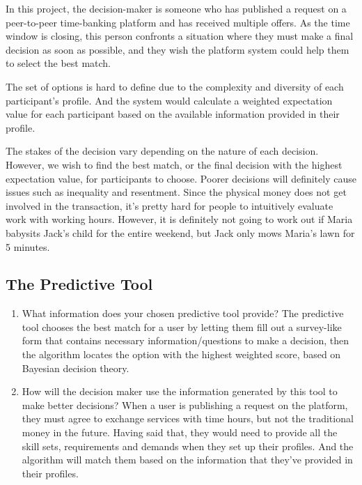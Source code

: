 \documentclass[
]{article}
\begin{document}
In this project, the decision-maker is someone who has published a
request on a peer-to-peer time-banking platform and has received
multiple offers. As the time window is closing, this person confronts a
situation where they must make a final decision as soon as possible, and
they wish the platform system could help them to select the best match.

The set of options is hard to define due to the complexity and diversity
of each participant's profile. And the system would calculate a weighted
expectation value for each participant based on the available
information provided in their profile.

The stakes of the decision vary depending on the nature of each
decision. However, we wish to find the best match, or the final decision
with the highest expectation value, for participants to choose. Poorer
decisions will definitely cause issues such as inequality and
resentment. Since the physical money does not get involved in the
transaction, it's pretty hard for people to intuitively evaluate work
with working hours. However, it is definitely not going to work out if
Maria babysits Jack's child for the entire weekend, but Jack only mows
Maria's lawn for 5 minutes.

\hypertarget{the-predictive-tool}{%
\subsection{The Predictive Tool}\label{the-predictive-tool}}

\begin{enumerate}
\def\labelenumi{\arabic{enumi}.}
\item
  What information does your chosen predictive tool provide? \newline 
  The predictive tool chooses the best match for a user by letting them
  fill out a survey-like form that contains necessary
  information/questions to make a decision, then the algorithm locates
  the option with the highest weighted score, based on Bayesian decision
  theory. \newline 
\item
  How will the decision maker use the information generated by this tool
  to make better decisions? \newline  When a user is publishing a
  request on the platform, they must agree to exchange services with
  time hours, but not the traditional money in the future. Having said
  that, they would need to provide all the skill sets, requirements and
  demands when they set up their profiles. And the algorithm will match
  them based on the information that they've provided in their profiles.
\end{enumerate}
\end{document}
